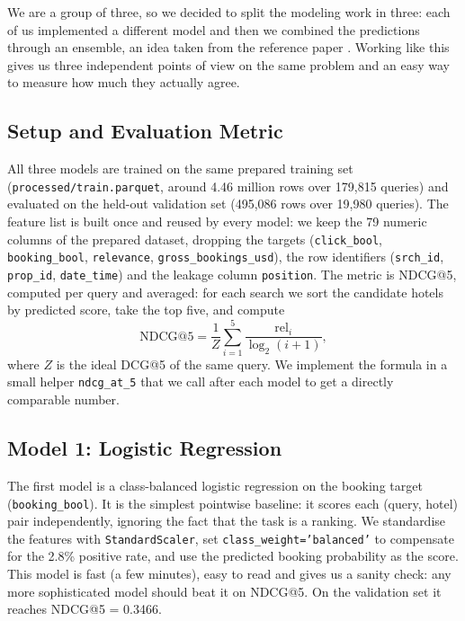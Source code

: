\documentclass[runningheads]{llncs}
\begin{document}
We are a group of three, so we decided to split the modeling work in three: each of us implemented a different model and then we combined the predictions through an ensemble, an idea taken from the reference paper \cite{DBLP:journals/corr/LiuXZYPLSW13}. Working like this gives us three independent points of view on the same problem and an easy way to measure how much they actually agree.

\subsection{Setup and Evaluation Metric}
All three models are trained on the same prepared training set (\texttt{processed/train.parquet}, around 4.46 million rows over 179{,}815 queries) and evaluated on the held-out validation set (495{,}086 rows over 19{,}980 queries). The feature list is built once and reused by every model: we keep the 79 numeric columns of the prepared dataset, dropping the targets (\texttt{click\_bool}, \texttt{booking\_bool}, \texttt{relevance}, \texttt{gross\_bookings\_usd}), the row identifiers (\texttt{srch\_id}, \texttt{prop\_id}, \texttt{date\_time}) and the leakage column \texttt{position}. The metric is NDCG@5, computed per query and averaged: for each search we sort the candidate hotels by predicted score, take the top five, and compute
\[
    \mathrm{NDCG@5} = \frac{1}{Z}\sum_{i=1}^{5}\frac{\mathrm{rel}_i}{\log_2(i+1)},
\]
where $Z$ is the ideal DCG@5 of the same query. We implement the formula in a small helper \texttt{ndcg\_at\_5} that we call after each model to get a directly comparable number.

\subsection{Model 1: Logistic Regression}
The first model is a class-balanced logistic regression on the booking target (\texttt{booking\_bool}). It is the simplest pointwise baseline: it scores each (query, hotel) pair independently, ignoring the fact that the task is a ranking. We standardise the features with \texttt{StandardScaler}, set \texttt{class\_weight='balanced'} to compensate for the 2.8\% positive rate, and use the predicted booking probability as the score. This model is fast (a few minutes), easy to read and gives us a sanity check: any more sophisticated model should beat it on NDCG@5. On the validation set it reaches NDCG@5 = 0.3466.
\end{document}
